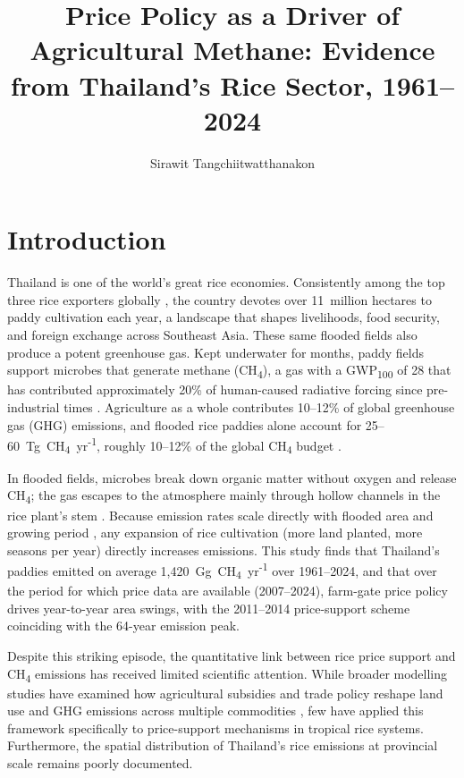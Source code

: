 \documentclass[fleqn,10pt]{olplainarticle}
\title{Price Policy as a Driver of Agricultural Methane: Evidence from
       Thailand's Rice Sector, 1961--2024}
\author[1]{Sirawit Tangchiitwatthanakon}
\affil[1]{The Hong Kong University of Science and Technology (Guangzhou), Guangzhou, China}
\begin{document}
\onehalfspacing

\flushbottom
\maketitle
\thispagestyle{empty}

\section*{Introduction}

Thailand is one of the world's great rice economies.
Consistently among the top three rice exporters globally \citep{faostat2026},
the country devotes over 11~million hectares to paddy cultivation each year, a landscape
that shapes livelihoods, food security, and foreign exchange across Southeast
Asia.
These same flooded fields also produce a potent greenhouse gas.
Kept underwater for months, paddy fields support microbes that generate
methane (CH\textsubscript{4}), a gas with a GWP\textsubscript{100} of 28
that has contributed approximately 20\% of human-caused radiative forcing
since pre-industrial times \citep{myhre2013}.
Agriculture as a whole contributes 10--12\% of global greenhouse gas (GHG)
emissions, and flooded rice paddies alone account for 25--60~Tg~CH\textsubscript{4}~yr\textsuperscript{-1},
roughly 10--12\% of the global CH\textsubscript{4} budget
\citep{neue1993, yan2009, smith2014}.

In flooded fields, microbes break down organic matter without oxygen and release
CH\textsubscript{4}; the gas escapes to the atmosphere mainly through hollow
channels in the rice plant's stem \citep{neue1993}.
Because emission rates scale directly with flooded area and growing period
\citep{ipcc2006}, any expansion of rice cultivation (more land planted, more
seasons per year) directly increases emissions.
This study finds that Thailand's paddies emitted on average
1,420~Gg~CH\textsubscript{4}~yr\textsuperscript{-1} over 1961--2024,
and that over the period for which price data are available (2007--2024),
farm-gate price policy drives year-to-year area swings, with the 2011--2014 price-support scheme coinciding
with the 64-year emission peak.

Despite this striking episode, the quantitative link between rice price
support and CH\textsubscript{4} emissions has received limited scientific
attention.
While broader modelling studies have examined how agricultural subsidies
and trade policy reshape land use and GHG emissions across multiple commodities
\citep{mosnier2014, frank2018}, few have applied this framework specifically
to price-support mechanisms in tropical rice systems.
Furthermore, the spatial distribution of Thailand's rice emissions at
provincial scale remains poorly documented.
\end{document}
